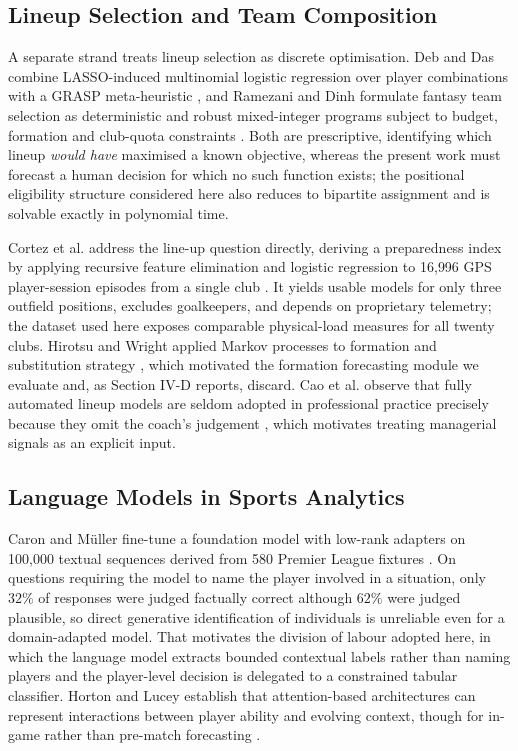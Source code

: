 \documentclass[conference]{IEEEtran}
\begin{document}
\subsection{Lineup Selection and Team Composition}

A separate strand treats lineup selection as discrete optimisation. Deb and Das combine LASSO-induced multinomial logistic regression over player combinations with a GRASP meta-heuristic \cite{debdas2026}, and Ramezani and Dinh formulate fantasy team selection as deterministic and robust mixed-integer programs subject to budget, formation and club-quota constraints \cite{ramezanidinh2025}. Both are prescriptive, identifying which lineup \emph{would have} maximised a known objective, whereas the present work must forecast a human decision for which no such function exists; the positional eligibility structure considered here also reduces to bipartite assignment and is solvable exactly in polynomial time.

Cortez et al. address the line-up question directly, deriving a preparedness index by applying recursive feature elimination and logistic regression to 16{,}996 GPS player-session episodes from a single club \cite{cortez2022}. It yields usable models for only three outfield positions, excludes goalkeepers, and depends on proprietary telemetry; the dataset used here exposes comparable physical-load measures for all twenty clubs. Hirotsu and Wright applied Markov processes to formation and substitution strategy \cite{hirotsuwright2003}, which motivated the formation forecasting module we evaluate and, as Section IV-D reports, discard. Cao et al. observe that fully automated lineup models are seldom adopted in professional practice precisely because they omit the coach's judgement \cite{caoetal2022}, which motivates treating managerial signals as an explicit input.

\subsection{Language Models in Sports Analytics}

Caron and M\"uller fine-tune a foundation model with low-rank adapters on 100{,}000 textual sequences derived from 580 Premier League fixtures \cite{caronmueller2023}. On questions requiring the model to name the player involved in a situation, only $32\%$ of responses were judged factually correct although $62\%$ were judged plausible, so direct generative identification of individuals is unreliable even for a domain-adapted model. That motivates the division of labour adopted here, in which the language model extracts bounded contextual labels rather than naming players and the player-level decision is delegated to a constrained tabular classifier. Horton and Lucey establish that attention-based architectures can represent interactions between player ability and evolving context, though for in-game rather than pre-match forecasting \cite{hortonlucey2025}.
\end{document}
